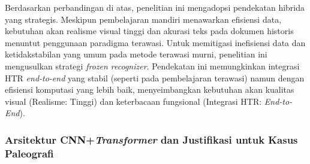 \documentclass[12pt,a4paper]{article}
\begin{document}
Berdasarkan perbandingan di atas, penelitian ini mengadopsi pendekatan hibrida yang strategis. Meskipun pembelajaran mandiri menawarkan efisiensi data, kebutuhan akan realisme visual tinggi dan akurasi teks pada dokumen historis menuntut penggunaan paradigma terawasi. Untuk memitigasi inefisiensi data dan ketidakstabilan yang umum pada metode terawasi murni, penelitian ini mengusulkan strategi \textit{frozen recognizer}. Pendekatan ini memungkinkan integrasi HTR \textit{end-to-end} yang stabil (seperti pada pembelajaran terawasi) namun dengan efisiensi komputasi yang lebih baik, menyeimbangkan kebutuhan akan kualitas visual (Realisme: Tinggi) dan keterbacaan fungsional (Integrasi HTR: \textit{End-to-End}).

\subsubsection{Arsitektur CNN+\textit{Transformer} dan Justifikasi untuk Kasus Paleografi}
\label{subsubsec:arsitektur-cnn-transformer-paleografi}
\end{document}
